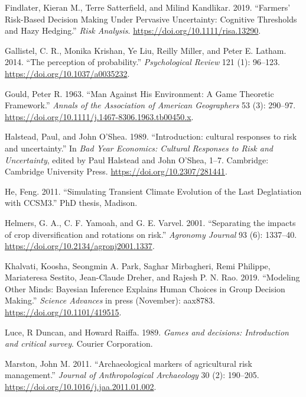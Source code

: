 \documentclass[smallextended]{svjour3}       %
\begin{document}
\leavevmode\hypertarget{ref-Findlater2019}{}%
Findlater, Kieran M., Terre Satterfield, and Milind Kandlikar. 2019. ``Farmers' Risk-Based Decision Making Under Pervasive Uncertainty: Cognitive Thresholds and Hazy Hedging.'' \emph{Risk Analysis}. \url{https://doi.org/10.1111/risa.13290}.

\leavevmode\hypertarget{ref-Gallistel2014}{}%
Gallistel, C. R., Monika Krishan, Ye Liu, Reilly Miller, and Peter E. Latham. 2014. ``The perception of probability.'' \emph{Psychological Review} 121 (1): 96--123. \url{https://doi.org/10.1037/a0035232}.

\leavevmode\hypertarget{ref-GOULD1963a}{}%
Gould, Peter R. 1963. ``Man Against His Environment: A Game Theoretic Framework.'' \emph{Annals of the Association of American Geographers} 53 (3): 290--97. \url{https://doi.org/10.1111/j.1467-8306.1963.tb00450.x}.

\leavevmode\hypertarget{ref-Halstead1989}{}%
Halstead, Paul, and John O'Shea. 1989. ``Introduction: cultural responses to risk and uncertainty.'' In \emph{Bad Year Economics: Cultural Responses to Risk and Uncertainty}, edited by Paul Halstead and John O'Shea, 1--7. Cambridge: Cambridge University Press. \url{https://doi.org/10.2307/281441}.

\leavevmode\hypertarget{ref-He2011}{}%
He, Feng. 2011. ``Simulating Transient Climate Evolution of the Last Deglatiation with CCSM3.'' PhD thesis, Madison.

\leavevmode\hypertarget{ref-Helmers2001}{}%
Helmers, G. A., C. F. Yamoah, and G. E. Varvel. 2001. ``Separating the impacts of crop diversification and rotations on risk.'' \emph{Agronomy Journal} 93 (6): 1337--40. \url{https://doi.org/10.2134/agronj2001.1337}.

\leavevmode\hypertarget{ref-Khalvati2019}{}%
Khalvati, Koosha, Seongmin A. Park, Saghar Mirbagheri, Remi Philippe, Mariateresa Sestito, Jean-Claude Dreher, and Rajesh P. N. Rao. 2019. ``Modeling Other Minds: Bayesian Inference Explains Human Choices in Group Decision Making.'' \emph{Science Advances} in press (November): aax8783. \url{https://doi.org/10.1101/419515}.

\leavevmode\hypertarget{ref-Luce1989}{}%
Luce, R Duncan, and Howard Raiffa. 1989. \emph{Games and decisions: Introduction and critical survey}. Courier Corporation.

\leavevmode\hypertarget{ref-Marston2011}{}%
Marston, John M. 2011. ``Archaeological markers of agricultural risk management.'' \emph{Journal of Anthropological Archaeology} 30 (2): 190--205. \url{https://doi.org/10.1016/j.jaa.2011.01.002}.
\end{document}
